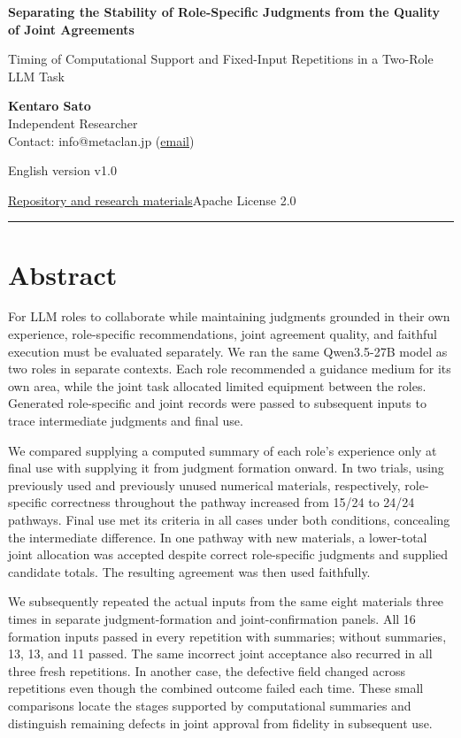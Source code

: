 \documentclass[10pt,a4paper]{article}
\begin{document}
\fontsize{10.7}{15.3}\selectfont\thispagestyle{first}
{\raggedright\sffamily\bfseries\color{ink}\fontsize{22}{27}\selectfont Separating the Stability of Role-Specific Judgments from the Quality of Joint Agreements\par}

{\raggedright\sffamily\fontsize{13}{17}\selectfont\color{accent} Timing of Computational Support and Fixed-Input Repetitions in a Two-Role LLM Task\par}

{\small \textbf{Kentaro Sato}\\
Independent Researcher\\
Contact: info@metaclan.jp (\href{mailto:info@metaclan.jp}{email})

English version v1.0\par}
{\small \href{https://github.com/metaSATOKEN/MRSI/tree/9443de315d283874df0c27e0e99b8c04f400709d}{Repository and research materials}\quad\textbar\quad Apache License 2.0\par}\smallskip\hrule\medskip

\section{Abstract}\label{paper-03-abstract}

For LLM roles to collaborate while maintaining judgments grounded in their own experience, role-specific recommendations, joint agreement quality, and faithful execution must be evaluated separately. We ran the same Qwen3.5-27B model as two roles in separate contexts. Each role recommended a guidance medium for its own area, while the joint task allocated limited equipment between the roles. Generated role-specific and joint records were passed to subsequent inputs to trace intermediate judgments and final use.

We compared supplying a computed summary of each role's experience only at final use with supplying it from judgment formation onward. In two trials, using previously used and previously unused numerical materials, respectively, role-specific correctness throughout the pathway increased from 15/24 to 24/24 pathways. Final use met its criteria in all cases under both conditions, concealing the intermediate difference. In one pathway with new materials, a lower-total joint allocation was accepted despite correct role-specific judgments and supplied candidate totals. The resulting agreement was then used faithfully.

We subsequently repeated the actual inputs from the same eight materials three times in separate judgment-formation and joint-confirmation panels. All 16 formation inputs passed in every repetition with summaries; without summaries, 13, 13, and 11 passed. The same incorrect joint acceptance also recurred in all three fresh repetitions. In another case, the defective field changed across repetitions even though the combined outcome failed each time. These small comparisons locate the stages supported by computational summaries and distinguish remaining defects in joint approval from fidelity in subsequent use.
\end{document}
